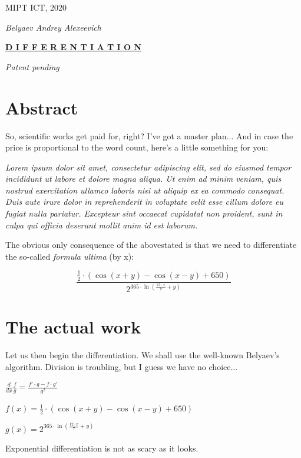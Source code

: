 \documentclass[12pt]{article}
\begin{document}
\begin{fleqn}[\parindent]
\begin{titlepage}\begin{center}\Large MIPT ICT, 2020\end{center}\begin{center}\Large\textit{Belyaev Andrey Alexeevich}\end{center}\begin{center}\Huge\textbf{\underline{D I F F E R E N T I A T I O N}}\end{center}\begin{center}\large\textit{Patent pending}\end{center}\section{\Large{Abstract}}
So, scientific works get paid for, right? I've got a master plan... 
And in case the price is proportional to the word count, here's a little something for you:\par
\textit{Lorem ipsum dolor sit amet, consectetur adipiscing elit, sed do eiusmod tempor incididunt ut labore et dolore magna aliqua. Ut enim ad minim veniam, quis nostrud exercitation ullamco laboris nisi ut aliquip ex ea commodo consequat. Duis aute irure dolor in reprehenderit in voluptate velit esse cillum dolore eu fugiat nulla pariatur. Excepteur sint occaecat cupidatat non proident, sunt in culpa qui officia deserunt mollit anim id est laborum.}\par
The obvious only consequence of the abovestated is that we need to differentiate the so-called \textit{formula ultima} (by x): \par
$$ \frac{\frac{ 1 }{ 2 } \cdot (\cos ( x  +  y ) - \cos ( x  -  y ) +  650 )}{{ 2 }^{ 365  \cdot \ln (\frac{ 12  \cdot  x }{ 7 } +  y )}} $$

\end{titlepage}

\section{\Large{The actual work}}

Let us then begin the differentiation. We shall use the well-known Belyaev's algorithm.
Division is troubling, but I guess we have no choice...\par
$ \frac{d}{dx} \frac{f}{g} = \frac{f' \cdot g - f \cdot g'}{g^2} $\par
$ f(x) = \frac{ 1 }{ 2 } \cdot (\cos ( x  +  y ) - \cos ( x  -  y ) +  650 ) $\par
$ g(x) = { 2 }^{ 365  \cdot \ln (\frac{ 12  \cdot  x }{ 7 } +  y )} $\par
Exponential differentiation is not as scary as it looks.


\end{fleqn}
\end{document}
